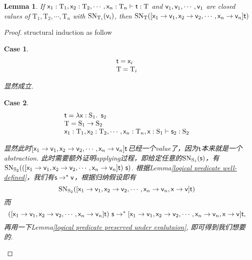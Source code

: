 \documentclass{article}
\theoremstyle{plain}
\newtheorem{lemma}[theorem]{Lemma}
\newtheorem{case}{Case}
\theoremstyle{nonumberplain}
\newtheorem{proof}{Proof}
\newcommand{\lam}[2]{\ensuremath{\lambda #1\ldotp~ #2}} %
\newcommand{\singletype}[1]{\text{#1}}
\newcommand{\termtype}[2]{\ensuremath{#1:#2}}
\newcommand{\term}[1]{\ensuremath\mathsf{#1}}
\begin{document}
\begin{lemma}\label{logical predicate under substitution}
\rm If $\termtype{\term{x}_1}{\singletype{T}_1},\termtype{\term{x}_2}{\singletype{T}_2},\cdots,\termtype{\term{x}_n}{\singletype{T}_n} \vdash \termtype{\term{t}}{\singletype{T}}$ and $\term{v}_1,\term{v}_1,\cdots,\term{v}_1$ are closed values of $\singletype{T}_1,\singletype{T}_2,\cdots,\singletype{T}_n$ with $\text{SN}_{\singletype{T}_i}(\term{v}_i)$, then $\text{SN}_{\singletype{T}}([\term{x}_1 \to \term{v}_1,\term{x}_2 \to \term{v}_2,\cdots,\term{x}_n \to \term{v}_n]\term{t})$
\end{lemma}

\begin{proof}
\rm structural induction as follow
\begin{case}
$$
\begin{array}{ll}
\term{t} = \term{x}_i \\
\singletype{T} = \singletype{T}_i
\end{array}
$$ 

显然成立.
\end{case}

\begin{case}
$$
\begin{array}{ll}
\term{t} = \lam{\termtype{\term{x}}{\singletype{S}_1}}{\term{s}_2} \\
\singletype{T}=\singletype{S}_1 \to \singletype{S}_2 \\
\termtype{\term{x}_1}{\singletype{T}_1},\termtype{\term{x}_2}{\singletype{T}_2},\cdots,\termtype{\term{x}_n}{\singletype{T}_n},\termtype{\term{x}}{\singletype{S}_1} \vdash \termtype{\term{s}_2}{\singletype{S}_2}
\end{array}
$$

显然此时$[\term{x}_1 \to \term{v}_1,\term{x}_2 \to \term{v}_2,\cdots,\term{x}_n \to \term{v}_n]\term{t}$已经一个value了，因为$\term{t}$本来就是一个abstraction.	此时需要额外证明applying过程，即给定任意的$\text{SN}_{\singletype{S}_1}(\term{s})$，有$\text{SN}_{\singletype{S}_2}(([\term{x}_1 \to \term{v}_1,\term{x}_2 \to \term{v}_2,\cdots,\term{x}_n \to \term{v}_n]\term{t})~\term{s})$. 根据Lemma\ref{logical predicate well-defined}，我们有$\term{s} \to^* \term{v}$，根据归纳假设即有
$$
\text{SN}_{\singletype{S}_2}([\term{x}_1 \to \term{v}_1,\term{x}_2 \to \term{v}_2,\cdots,\term{x}_n \to \term{v}_n,\term{x} \to \term{v} ]\term{t})
$$
而
$$
([\term{x}_1 \to \term{v}_1,\term{x}_2 \to \term{v}_2,\cdots,\term{x}_n \to \term{v}_n]\term{t})~\term{s} \to^* [\term{x}_1 \to \term{v}_1,\term{x}_2 \to \term{v}_2,\cdots,\term{x}_n \to \term{v}_n,\term{x} \to \term{v} ]\term{t},
$$
再用一下Lemma\ref{logical predicate preserved under evalutaion}, 即可得到我们想要的. 
\end{case}


\end{proof}
\end{document}
